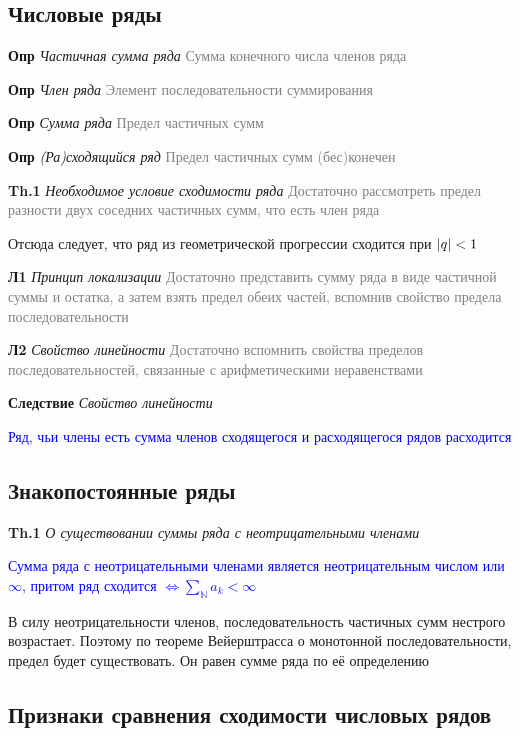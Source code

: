 \subsection{Числовые ряды}

\textbf{Опр} \textit{Частичная сумма ряда} \textcolor{gray}{Сумма конечного числа членов ряда}

\textbf{Опр} \textit{Член ряда} \textcolor{gray}{Элемент последовательности суммирования}

\textbf{Опр} \textit{Сумма ряда} \textcolor{gray}{Предел частичных сумм}

\textbf{Опр} \textit{(Ра)сходящийся ряд} \textcolor{gray}{Предел частичных сумм (бес)конечен}

\textbf{Th.1} \textit{Необходимое условие сходимости ряда} \textcolor{gray}{Достаточно рассмотреть предел
разности двух соседних частичных сумм, что есть член ряда}

Отсюда следует, что ряд из геометрической прогрессии сходится при $\abs{q} < 1$

\textbf{Л1} \textit{Принцип локализации} \textcolor{gray}{Достаточно представить сумму ряда в виде частичной
суммы и остатка, а затем взять предел обеих частей, вспомнив свойство предела последовательности}

\textbf{Л2} \textit{Свойство линейности} \textcolor{gray}{Достаточно вспомнить свойства пределов
последовательностей, связанные с арифметическими неравенствами}

\textbf{Следствие} \textit{Свойство линейности}

\textcolor{blue}{Ряд, чьи члены есть сумма членов сходящегося и расходящегося рядов расходится}

\subsection{Знакопостоянные ряды}

\textbf{Th.1} \textit{О существовании суммы ряда с неотрицательными членами}

\textcolor{blue}{Сумма ряда с неотрицательными членами является неотрицательным числом или $\infty$, притом ряд
сходится $\Leftrightarrow \sum_{\mathbb{N}}^{}a_k < \infty$}

В силу неотрицательности членов, последовательность частичных сумм нестрого возрастает.
Поэтому по теореме Вейерштрасса о монотонной последовательности, предел будет существовать.
Он равен сумме ряда по её определению

\subsection{Признаки сравнения сходимости числовых рядов}


